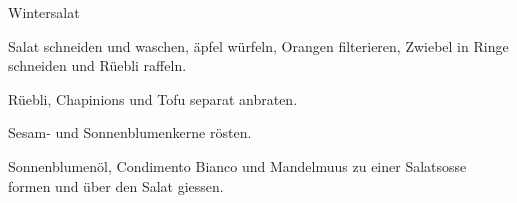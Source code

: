 
\begin{recipe}[]{Wintersalat}{}{}




\step%
Salat schneiden und waschen, \"apfel w\"urfeln, Orangen filterieren, Zwiebel
in Ringe schneiden und R\"uebli raffeln.

\step%
R\"uebli, Chapinions und Tofu separat anbraten.

\step%
Sesam- und Sonnenblumenkerne r\"osten.


\step%
Sonnenblumen\"ol, Condimento Bianco und Mandelmuus zu einer Salatsosse formen
und \"uber den Salat giessen.


\end{recipe}
